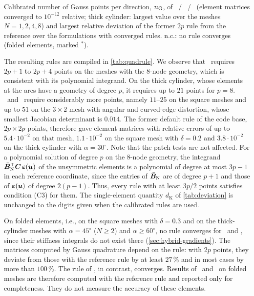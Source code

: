 \begin{table}[htbp]
  \centering\small
  \caption{Calibrated number of Gauss points per direction, $\nG$, of \PP\ / \PM\ / \PH\ (element matrices converged to $10^{-12}$ relative; thick cylinder: largest value over the meshes $N=1,2,4,8$) and largest relative deviation of the former $2p$ rule from the reference over the formulations with converged rules. n.c.: no rule converges (folded elements, marked $^\ast$).}
  \label{tab:quadrule}
  \begin{adjustbox}{max width=\linewidth}\end{adjustbox}
\end{table}
The resulting rules are compiled in \cref{tab:quadrule}. We observe that \PM\ requires $2p+1$ to $2p+4$ points on the meshes with the 8-node geometry, which is consistent with its polynomial integrand. On the thick cylinder, whose elements at the arcs have a geometry of degree $p$, it requires up to $21$ points for $p=8$. \PP\ and \PH\ require considerably more points, namely $11$--$25$ on the square meshes and up to $51$ on the $3\times2$ mesh with angular and curved-edge distortion, whose smallest Jacobian determinant is $0.014$. The former default rule of the code base, $2p\times2p$ points, therefore gave element matrices with relative errors of up to $5.4\cdot10^{-2}$ on that mesh, $1.1\cdot10^{-2}$ on the square mesh with $\delta=0.2$ and $3.8\cdot10^{-2}$ on the thick cylinder with $\alpha=30^\circ$. Note that the patch tests are not affected. For a polynomial solution of degree $p$ on the 8-node geometry, the integrand $\bar{\bm{B}}_{\mathrm N}^\top\bm{C}\,\bm\varepsilon(\bm{u})$ of the unsymmetric elements is a polynomial of degree at most $3p-1$ in each reference coordinate, since the entries of $\bar{\bm{B}}_{\mathrm N}$ are of degree $p+1$ and those of $\bm\varepsilon(\bm{u})$ of degree $2(p-1)$. Thus, every rule with at least $3p/2$ points satisfies condition (C3) for them. The single-element quantity $d_{\mathrm{K}}$ of \cref{tab:deviation} is unchanged to the digits given when the calibrated rules are used.

On folded elements, i.e., on the square meshes with $\delta=0.3$ and on the thick-cylinder meshes with $\alpha=45^\circ$ ($N\ge2$) and $\alpha\ge60^\circ$, no rule converges for \PP\ and \PH, since their stiffness integrals do not exist there (\cref{sec:hybrid-gradients}). The matrices computed by Gauss quadrature depend on the rule: with $2p$ points, they deviate from those with the reference rule by at least $27\,\%$ and in most cases by more than $100\,\%$. The rule of \PM, in contrast, converges. Results of \PP\ and \PH\ on folded meshes are therefore computed with the reference rule and reported only for completeness. They do not measure the accuracy of these elements.
%
